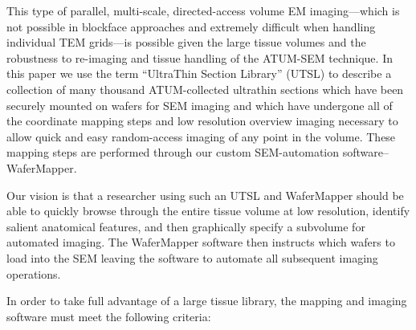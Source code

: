 \documentclass{article}
\begin{document}
This type of parallel, multi-scale, directed-access volume EM imaging—which is not possible in blockface approaches and extremely difficult when handling individual TEM grids—is possible given the large tissue volumes and the robustness to re-imaging and tissue handling of the ATUM-SEM technique. In this paper we use the term “UltraThin Section Library” (UTSL) to describe a collection of many thousand ATUM-collected ultrathin sections which have been securely mounted on wafers for SEM imaging and which have undergone all of the coordinate mapping steps and low resolution overview imaging necessary to allow quick and easy random-access imaging of any point in the volume. These mapping steps are performed through our custom SEM-automation software–WaferMapper.

Our vision is that a researcher using such an UTSL and WaferMapper should be able to quickly browse through the entire tissue volume at low resolution, identify salient anatomical features, and then graphically specify a subvolume for automated imaging. The WaferMapper software then instructs which wafers to load into the SEM leaving the software to automate all subsequent imaging operations.

In order to take full advantage of a large tissue library, the mapping and imaging software must meet the following criteria:
\end{document}
